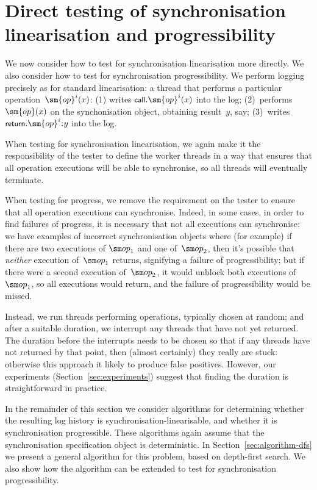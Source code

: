 \section{Direct testing of synchronisation linearisation and progressibility}
\label{sec:direct}

We now consider how to test for synchronisation linearisation more directly.
We also consider how to test for synchronisation progressibility.  
We perform logging precisely as for standard linearisation: a thread that
performs a particular operation~$\sm{op}^i(x)$: (1) writes
$\call.\sm{op}^i(x)$ into the log; (2)~performs $\sm{op}(x)$ on the
synchonisation object, obtaining result~$y$, say; (3)~writes
$\return.\sm{op}^i \:: y$ into the log.  

When testing for synchronisation linearisation, we again make it the
responsibility of the tester to define the worker threads in a way that
ensures that all operation executions will be able to synchronise, so all
threads will eventually terminate. 

When testing for progress, we remove the requirement on the tester to ensure
that all operation executions can synchronise.  Indeed, in some cases, in
order to find failures of progress, it is necessary that not all executions
can synchronise: we have examples of incorrect synchronisation objects where
(for example) if there are two executions of $\op_1$ and one of~$\op_2$, then
it's possible that \emph{neither} execution of~$\op_1$ returns, signifying
a failure of progressibility; but if there were a second execution
of~$\op_2$, it would unblock both executions of~$\op_1$, so all executions
would return, and the failure of progressibility would be missed.

Instead, we run threads performing operations, typically chosen at random; and
after a suitable duration, we interrupt any threads that have not yet
returned.  The duration before the interrupts needs to be chosen so that if
any threads have not returned by that point, then (almost certainly) they
really are stuck: otherwise this approach it likely to produce false
positives.  However, our experiments (Section~\ref{sec:experiments}) suggest
that finding the duration is straightforward in practice.

In the remainder of this section we consider algorithms for determining
whether the resulting log history is synchronisation-linearisable, and whether
it is synchronisation progressible.  These algorithms again assume that the
synchronisation specification object is deterministic.  In
Section~\ref{sec:algorithm-dfs} we present a general algorithm for this
problem, based on depth-first search.  We also show how the algorithm can be
extended to test for synchronisation progressibility.

